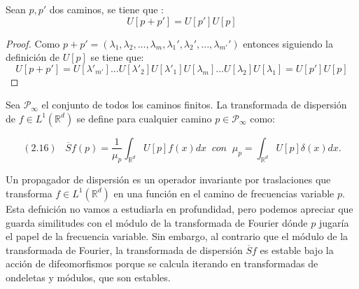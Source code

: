\begin{proposicion} \label{proposicionSumaCaminos}
Sean $p, p'$ dos caminos, se tiene que :
$$U[p+p']=U[p']U[p]$$
\end{proposicion}

\begin{proof}
Como $p+p'=(\lambda_1,\lambda_2,...,\lambda_m,\lambda_1',\lambda_2',...,\lambda_{m'}')$ entonces siguiendo la definición de $U[p]$ se tiene que: 
$$U[p+p']=U[\lambda'_{m'}]...U[\lambda'_2]U[\lambda'_1]U[\lambda_{m}]...U[\lambda_2]U[\lambda_1]=U[p']U[p]$$ \qedhere
\end{proof}

\medskip


\begin{definicion}
Sea $\mathcal{P}_\infty$ el conjunto de todos los caminos finitos. La transformada de dispersión de $f \in L^1(\mathbb{R}^d)$ se define para cualquier camino $p \in \mathcal{P}_\infty$ como:

$$(2.16) \; \; \; \overline{S}f(p)=\frac{1}{\mu_p} \int_{\mathbb{R}^d}U[p]f(x)dx \; \; con \; \; \mu_p=\int_{\mathbb{R}^d} U[p] \delta(x)dx .$$
\end{definicion}

\medskip

\noindent Un propagador de dispersión es un operador invariante por traslaciones que transforma $f \in L^1(\mathbb{R}^d)$ en una función en el camino de frecuencias variable $p$. Esta defnición no vamos a estudiarla en profundidad, pero podemos apreciar que guarda similitudes con el módulo de la transformada de Fourier dónde $p$ jugaría el papel de la frecuencia variable. Sin embargo, al contrario que el módulo de la transformada de Fourier, la transformada de dispersión $\overline{S}f$ es estable bajo la acción de difeomorfismos porque se calcula iterando en transformadas de ondeletas y módulos, que son estables. 


